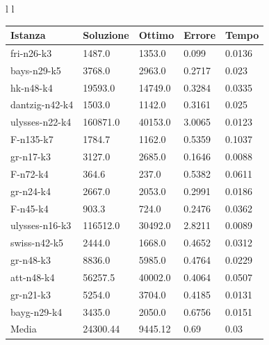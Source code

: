 \documentclass[]{article}
\begin{document}
\begin{tabular}{l l}
	\small	
		\begin{tabular}{||l | l l l l||} 
			\hline
			Istanza & Soluzione & Ottimo & Errore & Tempo \\ [0.5ex] 
			\hline\hline
			fri-n26-k3 & 1487.0 & 1353.0 & 0.099 & 0.0136  \\
			bays-n29-k5 & 3768.0 & 2963.0 & 0.2717 & 0.023  \\
			hk-n48-k4 & 19593.0 & 14749.0 & 0.3284 & 0.0335  \\
			dantzig-n42-k4 & 1503.0 & 1142.0 & 0.3161 & 0.025  \\
			ulysses-n22-k4 & 160871.0 & 40153.0 & 3.0065 & 0.0123  \\
			F-n135-k7 & 1784.7 & 1162.0 & 0.5359 & 0.1037  \\
			gr-n17-k3 & 3127.0 & 2685.0 & 0.1646 & \cellcolor{yellow} 0.0088  \\
			F-n72-k4 & 364.6 & 237.0 & 0.5382 & 0.0611  \\
			gr-n24-k4 & 2667.0 & 2053.0 & 0.2991 & 0.0186  \\
			F-n45-k4 & 903.3 & 724.0 & 0.2476 & 0.0362  \\	
			ulysses-n16-k3 & 116512.0 & 30492.0 & 2.8211 & 0.0089  \\
			swiss-n42-k5 & 2444.0 & 1668.0 & 0.4652 & 0.0312  \\
			gr-n48-k3 & 8836.0 & 5985.0 & 0.4764 & 0.0229  \\
			att-n48-k4 & 56257.5 & 40002.0 & 0.4064 & 0.0507  \\
			gr-n21-k3 & 5254.0 & 3704.0 & 0.4185 & 0.0131  \\
			bayg-n29-k4 & 3435.0 & 2050.0 & 0.6756 & 0.0151  \\
			\hline
			Media & 24300.44 & 9445.12 & 0.69 & 0.03  \\		
			[1ex] 
			\hline
		\end{tabular}


\end{tabular}
\end{document}

